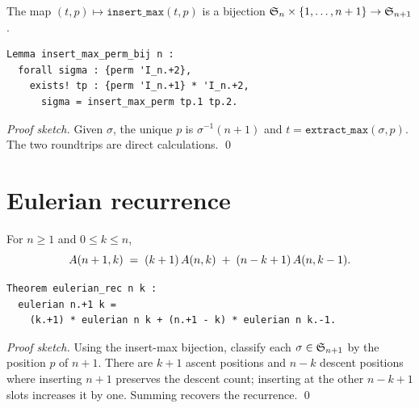 \begin{theorem}
  \label{thm:insert_max_bij}
  The map $(t, p) \mapsto \mathtt{insert\_max}(t, p)$ is a bijection
  $\mathfrak{S}_{n} \times \{1, \dots, n+1\} \to \mathfrak{S}_{n+1}$.
\end{theorem}

\begin{lstlisting}[language=Rocq]
Lemma insert_max_perm_bij n :
  forall sigma : {perm 'I_n.+2},
    exists! tp : {perm 'I_n.+1} * 'I_n.+2,
      sigma = insert_max_perm tp.1 tp.2.
\end{lstlisting}


\noindent
\emph{Proof sketch.} Given $\sigma$, the unique $p$ is
$\sigma^{-1}(n+1)$ and $t = \mathtt{extract\_max}(\sigma, p)$. The
two roundtrips are direct calculations. \qed

\section{Eulerian recurrence}
\label{sec:eulerian_rec}

\begin{theorem}
  \label{thm:eulerian_rec}
  For $n \geq 1$ and $0 \leq k \leq n$,
  \[
    A(n+1, k)
    \;=\;
    (k+1)\,A(n, k) \;+\; (n - k + 1)\,A(n, k-1).
  \]
\end{theorem}

\begin{lstlisting}[language=Rocq]
Theorem eulerian_rec n k :
  eulerian n.+1 k =
    (k.+1) * eulerian n k + (n.+1 - k) * eulerian n k.-1.
\end{lstlisting}


\noindent
\emph{Proof sketch.} Using the insert-max bijection, classify each
$\sigma \in \mathfrak{S}_{n+1}$ by the position $p$ of $n+1$. There are
$k+1$ ascent positions and $n - k$ descent positions where inserting
$n+1$ preserves the descent count; inserting at the other $n - k + 1$
slots increases it by one. Summing recovers the recurrence. \qed

